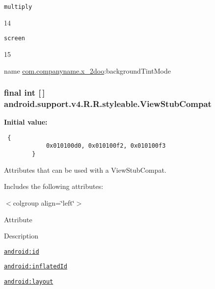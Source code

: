 {\tt multiply}

14

{\tt screen}

15

name \hyperlink{namespacecom_1_1companyname_1_1x__2doo}{com.companyname.x\_\-2doo}:backgroundTintMode \hypertarget{classandroid_1_1support_1_1v4_1_1_r_1_1styleable_2b14c683a11161f4740b13eb80af9370}{
\subsubsection[{ViewStubCompat}]{\setlength{\rightskip}{0pt plus 5cm}final int \mbox{[}$\,$\mbox{]} android.support.v4.R.R.styleable.ViewStubCompat}}
\label{classandroid_1_1support_1_1v4_1_1_r_1_1styleable_2b14c683a11161f4740b13eb80af9370}


\textbf{Initial value:}

\begin{Code}\begin{verbatim} {
            0x010100d0, 0x010100f2, 0x010100f3
        }
\end{verbatim}
\end{Code}
Attributes that can be used with a ViewStubCompat. 

Includes the following attributes: \begin{TabularC}{0}
\hline
\end{TabularC}
$<$colgroup align=\char`\"{}left\char`\"{}$>$ 

Attribute

Description 

{\tt \hyperlink{classandroid_1_1support_1_1v4_1_1_r_1_1styleable_38d2168866d2e90ab7678e5f08617eba}{android:id}}

{\tt \hyperlink{classandroid_1_1support_1_1v4_1_1_r_1_1styleable_fbb85415ec2416f8cfc401e1532b49ae}{android:inflatedId}}

{\tt \hyperlink{classandroid_1_1support_1_1v4_1_1_r_1_1styleable_e4052db577a557ecc97dc5c3f81aabd7}{android:layout}}

